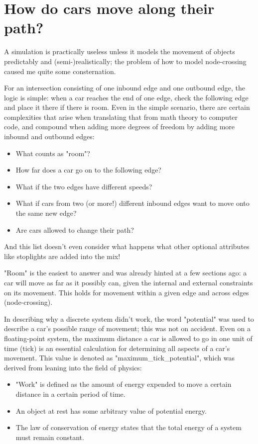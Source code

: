 \section{How do cars move along their path?}

\par A simulation is practically useless unless it models the movement of objects predictably and (semi-)realistically; the problem of how to model node-crossing caused me quite some consternation. \\

\par  For an intersection consisting of one inbound edge and one outbound edge, the logic is simple:  when a car reaches the end of one edge, check the following edge and place it there if there is room.  Even in the simple scenario, there are certain complexities that arise when translating that from math theory to computer code, and compound when adding more degrees of freedom by adding more inbound and outbound edges: 

\begin{itemize}
    \item What counts as "room"?
    \item How far does a car go on to the following edge?
    \item What if the two edges have different speeds?
    \item What if cars from two (or more!) different inbound edges want to move onto the same new edge?
    \item Are cars allowed to change their path?
\end{itemize}

\noindent And this list doesn't even consider what happens what other optional attributes like stoplights are added into the mix!\\

\par "Room" is the easiest to answer and was already hinted at a few sections ago:  a car will move as far as it possibly can, given the internal and external constraints on its movement.  This holds for movement within a given edge and across edges (node-crossing).  \\

\par In describing why a discrete system didn't work, the word "potential" was used to describe a car's possible range of movement; this was not on accident.  Even on a floating-point system, the maximum distance a car is allowed to go in one unit of time (tick) is an essential calculation for determining all aspects of a car's movement.  This value is denoted as "maximum\_tick\_potential", which was derived from leaning into the field of physics:
\begin{itemize}
    \item "Work" is defined as the amount of energy expended to move a certain distance in a certain period of time.
    \item An object at rest has some arbitrary value of potential energy.  
    \item The law of conservation of energy states that the total energy of a system must remain constant.
\end{itemize}


